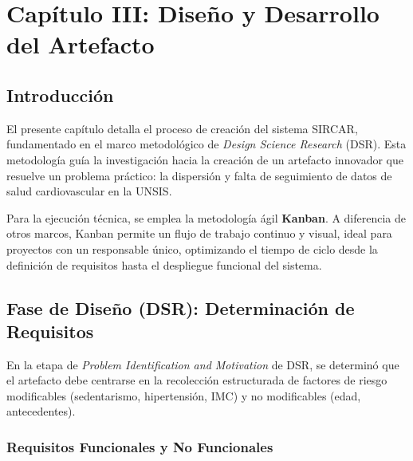\chapter{Capítulo III: Diseño y Desarrollo del Artefacto}

\section{Introducción}
El presente capítulo detalla el proceso de creación del sistema SIRCAR, fundamentado en el marco metodológico de \textit{Design Science Research} (DSR). Esta metodología guía la investigación hacia la creación de un artefacto innovador que resuelve un problema práctico: la dispersión y falta de seguimiento de datos de salud cardiovascular en la UNSIS. 

Para la ejecución técnica, se emplea la metodología ágil \textbf{Kanban}. A diferencia de otros marcos, Kanban permite un flujo de trabajo continuo y visual, ideal para proyectos con un responsable único, optimizando el tiempo de ciclo desde la definición de requisitos hasta el despliegue funcional del sistema.

\section{Fase de Diseño (DSR): Determinación de Requisitos}
En la etapa de \textit{Problem Identification and Motivation} de DSR, se determinó que el artefacto debe centrarse en la recolección estructurada de factores de riesgo modificables (sedentarismo, hipertensión, IMC) y no modificables (edad, antecedentes).

\subsection{Requisitos Funcionales y No Funcionales}

